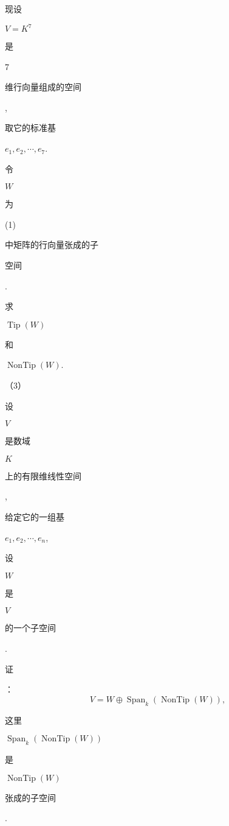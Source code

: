 \documentclass[10pt]{article}
\begin{document}
\begin{CJK}{UTF8}{mj}现设\end{CJK} $V=K^{7}$ \begin{CJK}{UTF8}{mj}是\end{CJK} 7 \begin{CJK}{UTF8}{mj}维行向量组成的空间\end{CJK}, \begin{CJK}{UTF8}{mj}取它的标准基\end{CJK} $e_{1}, e_{2}, \cdots, e_{7}$. \begin{CJK}{UTF8}{mj}令\end{CJK} $W$ \begin{CJK}{UTF8}{mj}为\end{CJK} (1) \begin{CJK}{UTF8}{mj}中矩阵的行向量张成的子\end{CJK} \begin{CJK}{UTF8}{mj}空间\end{CJK}. \begin{CJK}{UTF8}{mj}求\end{CJK} $\operatorname{Tip}(W)$ \begin{CJK}{UTF8}{mj}和\end{CJK} $\operatorname{NonTip}(W)$.

（3）\begin{CJK}{UTF8}{mj}设\end{CJK} $V$ \begin{CJK}{UTF8}{mj}是数域\end{CJK} $K$ \begin{CJK}{UTF8}{mj}上的有限维线性空间\end{CJK}, \begin{CJK}{UTF8}{mj}给定它的一组基\end{CJK} $e_{1}, e_{2}, \cdots, e_{n}$, \begin{CJK}{UTF8}{mj}设\end{CJK} $W$ \begin{CJK}{UTF8}{mj}是\end{CJK} $V$ \begin{CJK}{UTF8}{mj}的一个子空间\end{CJK}. \begin{CJK}{UTF8}{mj}证\end{CJK}：
$$
V=W \oplus \operatorname{Span}_{k}(\operatorname{NonTip}(W)),
$$
\begin{CJK}{UTF8}{mj}这里\end{CJK} $\operatorname{Span}_{k}(\operatorname{NonTip}(W))$ \begin{CJK}{UTF8}{mj}是\end{CJK} $\operatorname{NonTip}(W)$ \begin{CJK}{UTF8}{mj}张成的子空间\end{CJK}.
\end{document}
